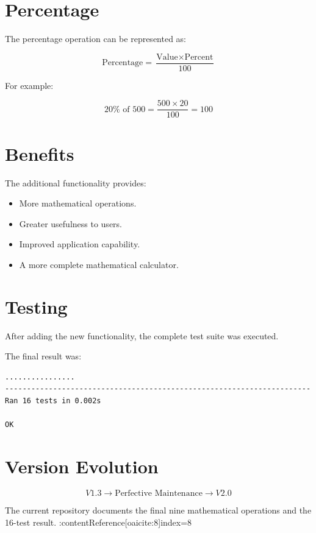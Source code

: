 \documentclass[12pt,a4paper]{report}
\begin{document}
\section{Percentage}

The percentage operation can be represented as:

\[
\text{Percentage} =
\frac{\text{Value}\times\text{Percent}}{100}
\]

For example:

\[
20\% \text{ of } 500
=
\frac{500\times20}{100}
=
100
\]

\section{Benefits}

The additional functionality provides:

\begin{itemize}
    \item More mathematical operations.
    \item Greater usefulness to users.
    \item Improved application capability.
    \item A more complete mathematical calculator.
\end{itemize}

\section{Testing}

After adding the new functionality, the complete test suite was
executed.

The final result was:

\begin{lstlisting}
................
----------------------------------------------------------------------
Ran 16 tests in 0.002s

OK
\end{lstlisting}

\section{Version Evolution}

\[
V1.3
\rightarrow
\text{Perfective Maintenance}
\rightarrow
V2.0
\]

The current repository documents the final nine mathematical
operations and the 16-test result. :contentReference[oaicite:8]{index=8}

\end{document}
